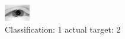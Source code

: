 \begin{figure}[h!]
\begin{center}
\includegraphics[width=0.60\columnwidth]{figures/ID2248_class_1_target_2.png}
\end{center}
\caption{ Classification: 1 actual target: 2}
\label{fig:ID2248_class_1_target_2}
\end{figure}
